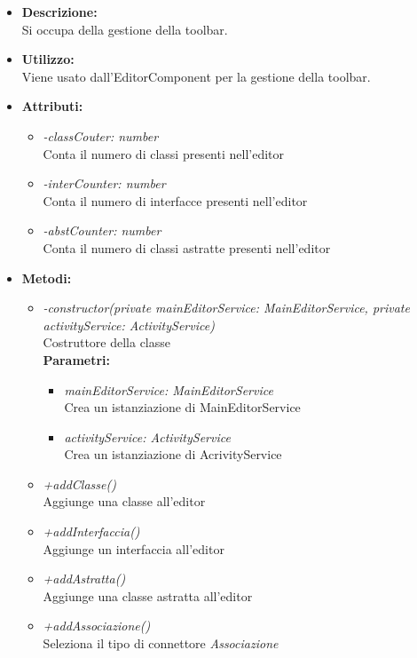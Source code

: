 \begin{itemize}
	\item \textbf{Descrizione:}\\
	Si occupa della gestione della toolbar.
	\item \textbf{Utilizzo:}\\
	Viene usato dall'EditorComponent per la gestione della toolbar.
	\item \textbf{Attributi:}
		\begin{itemize}
			\item \emph{-classCouter: number}\\
			Conta il numero di classi presenti nell'editor
			\item \emph{-interCounter: number}\\
			Conta il numero di interfacce presenti nell'editor
			\item \emph{-abstCounter: number}\\
			Conta il numero di classi astratte presenti nell'editor
		\end{itemize}
	\item \textbf{Metodi:}
		\begin{itemize}
			\item \emph{-constructor(private mainEditorService: MainEditorService, private activityService: ActivityService)}\\
    		Costruttore della classe\\
    		\textbf{Parametri:}
    		\begin{itemize}
    			\item \emph{mainEditorService: MainEditorService}\\
    			Crea un istanziazione di MainEditorService
    			\item \emph{activityService: ActivityService}\\
    			Crea un istanziazione di AcrivityService
    		\end{itemize}
    		\item \emph{+addClasse()}\\
    		Aggiunge una classe all'editor
    		\item \emph{+addInterfaccia()}\\
    		Aggiunge un interfaccia all'editor
    		\item \emph{+addAstratta()}\\
    		Aggiunge una classe astratta all'editor
    		\item \emph{+addAssociazione()}\\
    		Seleziona il tipo di connettore \textit{Associazione}

\end{itemize}
\end{itemize}
